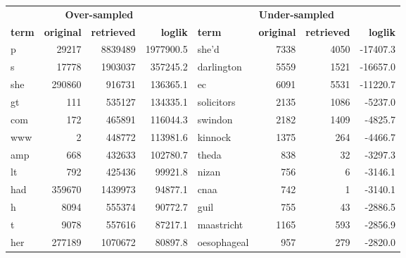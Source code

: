 \begin{table}[htb]
    \centering
    \begin{tabular}{|lrrr||lrrr|}
        \hline
        \multicolumn{4}{|c||}{{\bf Over-sampled}}                       & \multicolumn{4}{c|}{{\bf Under-sampled}}                         \\ 
        {\bf term} & {\bf original} & {\bf retrieved} & {\bf loglik} & {\bf term}    & {\bf original} & {\bf retrieved} & {\bf loglik} \\ \hline
        p          & 29217          & 8839489         & 1977900.5    & she'd         & 7338           & 4050            & -17407.3     \\
        s          & 17778          & 1903037         & 357245.2     & darlington    & 5559           & 1521            & -16657.0     \\
        she        & 290860         & 916731          & 136365.1     & ec            & 6091           & 5531            & -11220.7     \\
        gt         & 111            & 535127          & 134335.1     & solicitors    & 2135           & 1086            & -5237.0      \\
        com        & 172            & 465891          & 116044.3     & swindon       & 2182           & 1409            & -4825.7      \\
        www        & 2              & 448772          & 113981.6     & kinnock       & 1375           & 264             & -4466.7      \\
        amp        & 668            & 432633          & 102780.7     & theda         & 838            & 32              & -3297.3      \\
        lt         & 792            & 425436          & 99921.8      & nizan         & 756            & 6               & -3146.1      \\
        had        & 359670         & 1439973         & 94877.1      & cnaa          & 742            & 1               & -3140.1      \\
        h          & 8094           & 555374          & 90772.7      & guil          & 755            & 43              & -2886.5      \\
        t          & 9078           & 557616          & 87217.1      & maastricht    & 1165           & 593             & -2856.9      \\
        her        & 277189         & 1070672         & 80897.8      & oesophageal   & 957            & 279             & -2820.0      \\

\end{tabular}
\end{table}
